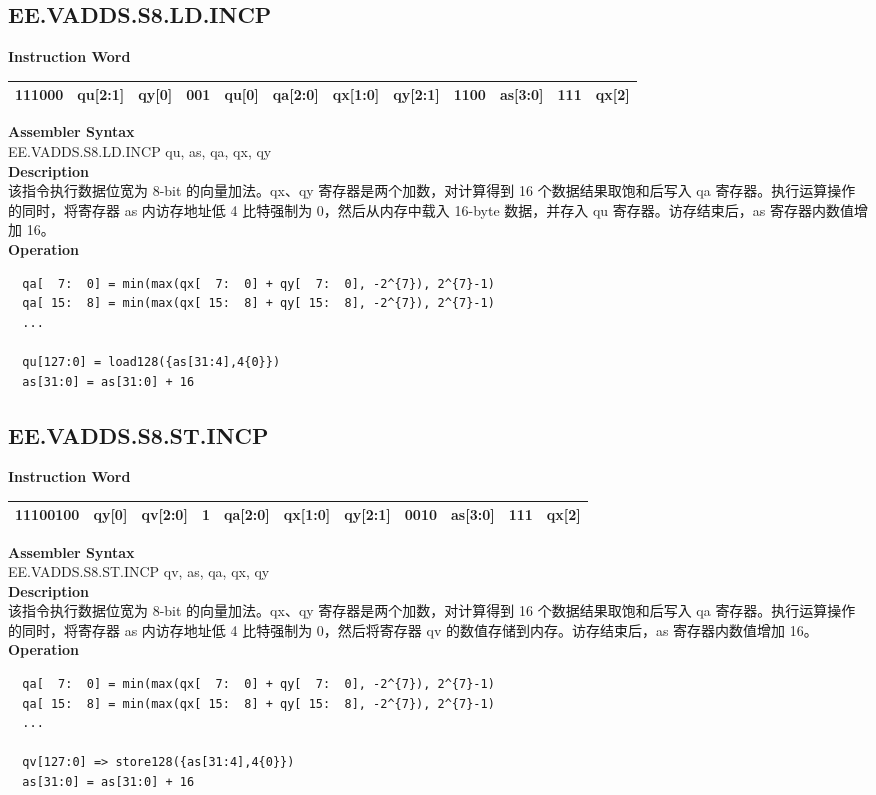 \clearpage
\subsection{EE.VADDS.S8.LD.INCP}\label{instruction:EEVADDSS8LDINCP}
\setlength\tabcolsep{6pt}
\textbf{Instruction Word} \\
\begin{tabular}{|c|c|c|c|c|c|c|c|c|c|c|c|}
	\hline
	111000 & qu[2:1] & qy[0] & 001 & qu[0] & qa[2:0] & qx[1:0] & qy[2:1] & 1100 & as[3:0] & 111 & qx[2] \\
	\hline
\end{tabular}

\textbf{Assembler Syntax} \\
EE.VADDS.S8.LD.INCP qu, as, qa, qx, qy \\
\textbf{Description} \\
该指令执行数据位宽为 8-bit 的向量加法。qx、qy 寄存器是两个加数，对计算得到 16 个数据结果取饱和后写入 qa 寄存器。执行运算操作的同时，将寄存器 as 内访存地址低 4 比特强制为 0，然后从内存中载入 16-byte 数据，并存入 qu 寄存器。访存结束后，as 寄存器内数值增加 16。\\
\textbf{Operation}
\begin{lstlisting}
  qa[  7:  0] = min(max(qx[  7:  0] + qy[  7:  0], -2^{7}), 2^{7}-1)
  qa[ 15:  8] = min(max(qx[ 15:  8] + qy[ 15:  8], -2^{7}), 2^{7}-1)
  ...

  qu[127:0] = load128({as[31:4],4{0}})
  as[31:0] = as[31:0] + 16
\end{lstlisting}

\clearpage
\subsection{EE.VADDS.S8.ST.INCP}\label{instruction:EEVADDSS8STINCP}
\setlength\tabcolsep{6pt}
\textbf{Instruction Word} \\
\begin{tabular}{|c|c|c|c|c|c|c|c|c|c|c|}
	\hline
	11100100 & qy[0] & qv[2:0] & 1 & qa[2:0] & qx[1:0] & qy[2:1] & 0010 & as[3:0] & 111 & qx[2] \\
	\hline
\end{tabular}

\textbf{Assembler Syntax} \\
EE.VADDS.S8.ST.INCP qv, as, qa, qx, qy \\
\textbf{Description} \\
该指令执行数据位宽为 8-bit 的向量加法。qx、qy 寄存器是两个加数，对计算得到 16 个数据结果取饱和后写入 qa 寄存器。执行运算操作的同时，将寄存器 as 内访存地址低 4 比特强制为 0，然后将寄存器 qv 的数值存储到内存。访存结束后，as 寄存器内数值增加 16。\\
\textbf{Operation}
\begin{lstlisting}
  qa[  7:  0] = min(max(qx[  7:  0] + qy[  7:  0], -2^{7}), 2^{7}-1)
  qa[ 15:  8] = min(max(qx[ 15:  8] + qy[ 15:  8], -2^{7}), 2^{7}-1)
  ...

  qv[127:0] => store128({as[31:4],4{0}})
  as[31:0] = as[31:0] + 16
\end{lstlisting}

